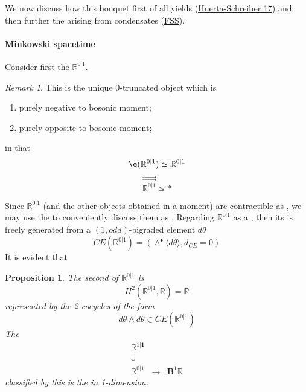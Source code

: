 \documentclass[12pt,titlepage]{article}
\newcommand{\itexarray}[1]{\begin{matrix}#1\end{matrix}}
\theoremstyle{plain}
\newtheorem{prop}{Proposition}
\theoremstyle{definition}
\theoremstyle{remark}
\newtheorem{remark}{Remark}
\begin{document}
We now discuss how this bouquet first of all yields  (\hyperlink{HuertaSchreiber17}{Huerta-Schreiber 17}) and then further the  arising from  condensates (\hyperlink{FSS}{FSS}).
\hypertarget{minkowski_spacetime}{}\paragraph*{{Minkowski spacetime}}\label{minkowski_spacetime}
Consider first the  $\mathbb{R}^{0|1}$.
\begin{remark}
\label{}\hypertarget{}{}
This is the unique 0-truncated object which is
\begin{enumerate}%
\item purely negative to bosonic moment;
\item purely opposite to bosonic moment;
\end{enumerate}
in that
\begin{displaymath}
\e(\mathbb{R}^{0|1})\simeq \mathbb{R}^{0|1}
\end{displaymath}
\begin{displaymath}
\stackrel{\rightrightarrows}{\mathbb{R}^{0|1}} \simeq \ast
\end{displaymath}
\end{remark}
Since $\mathbb{R}^{0|1}$ (and the other objects obtained in a moment) are contractible as , we may use the  to conveniently discuss them as . Regarding $\mathbb{R}^{0\vert 1}$ as a , then its  is freely generated from a $(1,odd)$-bigraded element $d\theta$
\begin{displaymath}
CE(\mathbb{R}^{0\vert 1})
=
\left(
\wedge^\bullet \langle d\theta \rangle, d_{CE} = 0
\right)
\end{displaymath}
It is evident that
\begin{prop}
\label{1dsuperMinkowskiFromInvariantExtension}\hypertarget{1dsuperMinkowskiFromInvariantExtension}{}
The second   of $\mathbb{R}^{0\vert 1}$ is
\begin{displaymath}
H^{2}(\mathbb{R}^{0\vert 1}, \mathbb{R})
=
\mathbb{R}
\end{displaymath}
represented by the 2-cocycles of the form
\begin{displaymath}
d\theta\wedge d\theta
\in CE(\mathbb{R}^{0\vert 1})
\end{displaymath}
The 
\begin{displaymath}
\itexarray{
\mathbb{R}^{1|\mathbf{1}}
\\
\downarrow
\\
\mathbb{R}^{0|1}
&\stackrel{}{\longrightarrow}&
\mathbf{B}^1 \mathbb{R}
}
\end{displaymath}
classified by this is the  in 1-dimension.
\end{prop}
\end{document}

